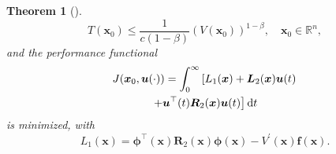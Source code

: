 \documentclass[lettersize,journal]{IEEEtran}
\newtheorem{theorem}{Theorem}
\begin{document}
\begin{theorem}[\cite{haddad2015finite}]
\begin{equation}\label{eq:settTimeOriginal}
T(\bm{x}_0) \leq \frac{1}{c(1-\beta)} (V(\bm{x}_0))^{1-\beta}, \quad \bm{x}_0 \in \mathbb{R}^{n}, 
\end{equation}
and the performance functional 
\begin{gather}
J(\bm{x}_0, \bm{u}(\cdot)) = \int_0^\infty \left[L_1(\bm{x}) + \bm{L}_2(\bm{x})\bm{u}(t) \right. \notag\\ 
\left. + \bm{u}^\top(t)\bm{R}_2(\bm{x})\bm{u}(t)\right] \textup{d}t \label{eq:JOld}
\end{gather}
is minimized, with
\begin{equation}\label{eq:L1Old}
L_1(\bm{x}) = \bm{\phi}^\top(\bm{x})\bm{R}_2(\bm{x})\bm{\phi}(\bm{x}) - V^\prime(\bm{x})\bm{f}(\bm{x}).
\end{equation}
\end{theorem}
\end{document}
